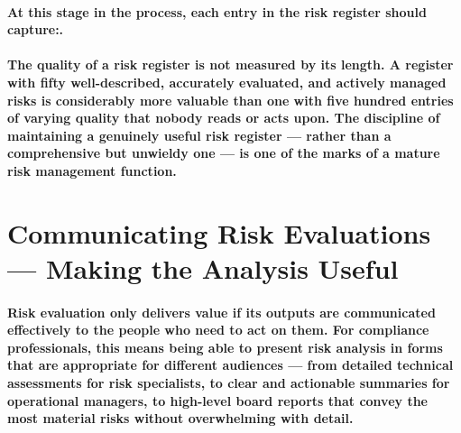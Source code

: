 \paragraph{At this stage in the process, each entry in the risk register should capture:.}
\begin{itemize}
\end{itemize}
\paragraph{The quality of a risk register is not measured by its length. A register with fifty well-described, accurately evaluated, and actively managed risks is considerably more valuable than one with five hundred entries of varying quality that nobody reads or acts upon. The discipline of maintaining a genuinely useful risk register — rather than a comprehensive but unwieldy one — is one of the marks of a mature risk management function.}

\section{Communicating Risk Evaluations — Making the Analysis Useful}
\paragraph{Risk evaluation only delivers value if its outputs are communicated effectively to the people who need to act on them. For compliance professionals, this means being able to present risk analysis in forms that are appropriate for different audiences — from detailed technical assessments for risk specialists, to clear and actionable summaries for operational managers, to high-level board reports that convey the most material risks without overwhelming with detail.}
